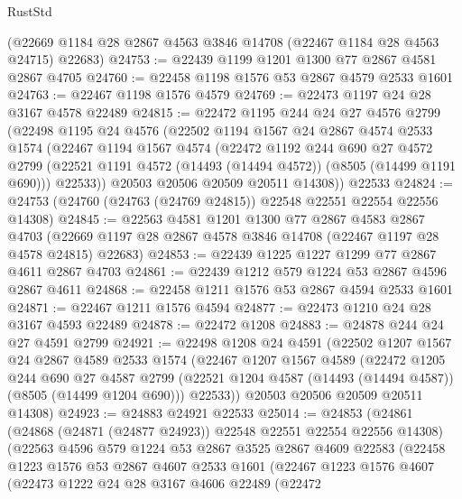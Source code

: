 \begin{lexlean}{RustStd}
\begin{coremodule}
    (@22669 @1184 @28 @2867 @4563 @3846 @14708 (@22467 @1184 @28 @4563 @24715) @22683)
@24753 := @22439 @1199 @1201 @1300 @77 @2867 @4581 @2867 @4705
@24760 := @22458 @1198 @1576 @53 @2867 @4579 @2533 @1601
@24763 := @22467 @1198 @1576 @4579
@24769 := @22473 @1197 @24 @28 @3167 @4578 @22489
@24815 := @22472
    @1195
    @244
    @24
    @27
    @4576
    @2799
    (@22498
      @1195
      @24
      @4576
      (@22502
        @1194
        @1567
        @24
        @2867
        @4574
        @2533
        @1574
        (@22467
          @1194
          @1567
          @4574
          (@22472
            @1192
            @244
            @690
            @27
            @4572
            @2799
            (@22521 @1191 @4572 (@14493 (@14494 @4572)) (@8505 (@14499 @1191 @690)))
            @22533))
        @20503
        @20506
        @20509
        @20511
        @14308))
    @22533
@24824 := @24753 (@24760 (@24763 (@24769 @24815)) @22548 @22551 @22554 @22556 @14308)
@24845 := @22563
    @4581
    @1201
    @1300
    @77
    @2867
    @4583
    @2867
    @4703
    (@22669 @1197 @28 @2867 @4578 @3846 @14708 (@22467 @1197 @28 @4578 @24815) @22683)
@24853 := @22439 @1225 @1227 @1299 @77 @2867 @4611 @2867 @4703
@24861 := @22439 @1212 @579 @1224 @53 @2867 @4596 @2867 @4611
@24868 := @22458 @1211 @1576 @53 @2867 @4594 @2533 @1601
@24871 := @22467 @1211 @1576 @4594
@24877 := @22473 @1210 @24 @28 @3167 @4593 @22489
@24878 := @22472 @1208
@24883 := @24878 @244 @24 @27 @4591 @2799
@24921 := @22498
    @1208
    @24
    @4591
    (@22502
      @1207
      @1567
      @24
      @2867
      @4589
      @2533
      @1574
      (@22467
        @1207
        @1567
        @4589
        (@22472
          @1205
          @244
          @690
          @27
          @4587
          @2799
          (@22521 @1204 @4587 (@14493 (@14494 @4587)) (@8505 (@14499 @1204 @690)))
          @22533))
      @20503
      @20506
      @20509
      @20511
      @14308)
@24923 := @24883 @24921 @22533
@25014 := @24853
    (@24861
      (@24868 (@24871 (@24877 @24923)) @22548 @22551 @22554 @22556 @14308)
      (@22563
        @4596
        @579
        @1224
        @53
        @2867
        @3525
        @2867
        @4609
        @22583
        (@22458
          @1223
          @1576
          @53
          @2867
          @4607
          @2533
          @1601
          (@22467
            @1223
            @1576
            @4607
            (@22473
              @1222
              @24
              @28
              @3167
              @4606
              @22489
              (@22472

\end{coremodule}
\end{lexlean}

